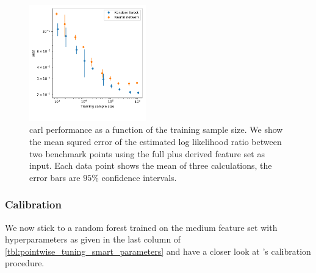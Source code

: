 \begin{figure}
  \includegraphics[width=0.45\textwidth]{figures/appendix/pointwise_tuning_full/mse_derived_training_sample_size.pdf}%
  \caption{carl performance as a function of the training sample size.
    We show the mean squred error of the estimated log likelihood
    ratio between two benchmark points using the full plus derived
    feature set as input. Each data point shows the mean of three
    calculations, the error bars are $95\%$ confidence intervals.}
  \label{fig:pointwise_tuning_derived_carl_tuning}
\end{figure}




\subsubsection*{Calibration}

We now stick to a random forest trained on the medium feature set with
hyperparameters as given in the last column of
\autoref{tbl:pointwise_tuning_smart_parameters} and have a closer look
at 's calibration procedure.

